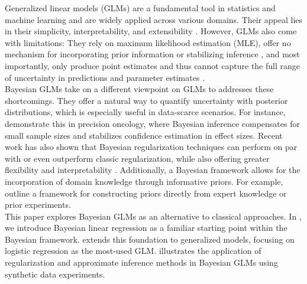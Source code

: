 Generalized linear models (GLMs) are a fundamental tool in statistics and machine learning and are widely applied across various domains.
Their appeal lies in their simplicity, interpretability, and extensibility \citep{nelder_generalized_1972}.
However, GLMs also come with limitations:
They rely on maximum likelihood estimation (MLE), offer no mechanism for incorporating prior information or stabilizing inference \citep{gelman_weakly_2008}, and most importantly, only produce point estimates and thus cannot capture the full range of uncertainty in predictions and parameter estimates \citep{tyralis_review_2024}.\\

Bayesian GLMs take on a different viewpoint on GLMs to addresses these shortcomings.
They offer a natural way to quantify uncertainty with posterior distributions, which is especially useful in data-scarce scenarios.
For instance, \citet{sondhi_bayesian_2021} demonstrate this in precision oncology, where Bayesian inference compensates for small sample sizes and stabilizes confidence estimation in effect sizes.
Recent work has also shown that Bayesian regularization techniques can perform on par with or even outperform classic regularization, while also offering greater flexibility and interpretability \citep[see e.g.][]{van_erp_shrinkage_2019,celeux_regularization_2012}.
Additionally, a Bayesian framework allows for the incorporation of domain knowledge through informative priors.
For example, \citet{chien_informative_2023} outline a framework for constructing priors directly from expert knowledge or prior experiments.\\

This paper explores Bayesian GLMs as an alternative to classical approaches.
In , we introduce Bayesian linear regression as a familiar starting point within the Bayesian framework.
 extends this foundation to generalized models, focusing on logistic regression as the most-used GLM.
 illustrates the application of regularization and approximate inference methods in Bayesian GLMs using synthetic data experiments.\\



